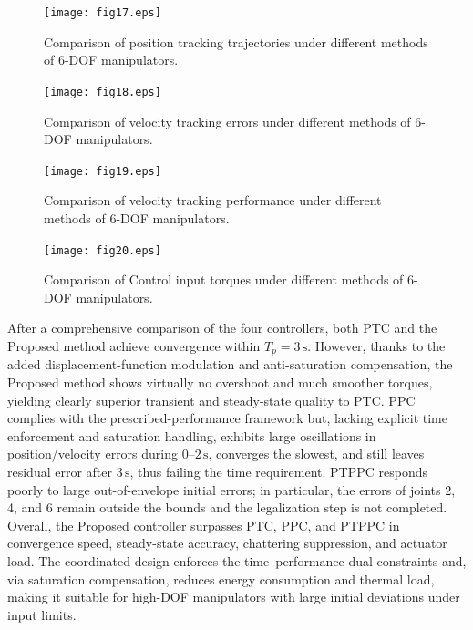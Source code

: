 \documentclass[pdflatex,sn-mathphys-num]{sn-jnl}%
\theoremstyle{thmstyleone}%
\theoremstyle{thmstyletwo}%
\theoremstyle{thmstylethree}%
\begin{document}
\begin{figure}[H]
	\centering
	\texttt{[image: fig17.eps]}
	\caption{Comparison of position tracking trajectories under different methods of 6-DOF manipulators.}
	\label{fig:17}
\end{figure}

\begin{figure}[H]
	\centering
	\texttt{[image: fig18.eps]}
	\caption{Comparison of velocity tracking errors under different methods of 6-DOF manipulators.}
	\label{fig:18}
\end{figure}
\begin{figure}[H]
	\centering
	\texttt{[image: fig19.eps]}
	\caption{Comparison of velocity tracking performance under different methods of 6-DOF manipulators.}
	\label{fig:19}
\end{figure}

\begin{figure}[H]
	\centering
	\texttt{[image: fig20.eps]}
	\caption{Comparison of Control input torques under different methods of 6-DOF manipulators.}
	\label{fig:20}
\end{figure}


After a comprehensive comparison of the four controllers, both PTC and the Proposed method achieve convergence within $T_p=3\,\mathrm{s}$. However, thanks to the added displacement-function modulation and anti-saturation compensation, the Proposed method shows virtually no overshoot and much smoother torques, yielding clearly superior transient and steady-state quality to PTC. PPC complies with the prescribed-performance framework but, lacking explicit time enforcement and saturation handling, exhibits large oscillations in position/velocity errors during $0\text{–}2\,\mathrm{s}$, converges the slowest, and still leaves residual error after $3\,\mathrm{s}$, thus failing the time requirement. PTPPC responds poorly to large out-of-envelope initial errors; in particular, the errors of joints 2, 4, and 6 remain outside the bounds and the legalization step is not completed. Overall, the Proposed controller surpasses PTC, PPC, and PTPPC in convergence speed, steady-state accuracy, chattering suppression, and actuator load. The coordinated design enforces the time–performance dual constraints and, via saturation compensation, reduces energy consumption and thermal load, making it suitable for high-DOF manipulators with large initial deviations under input limits.
\end{document}
